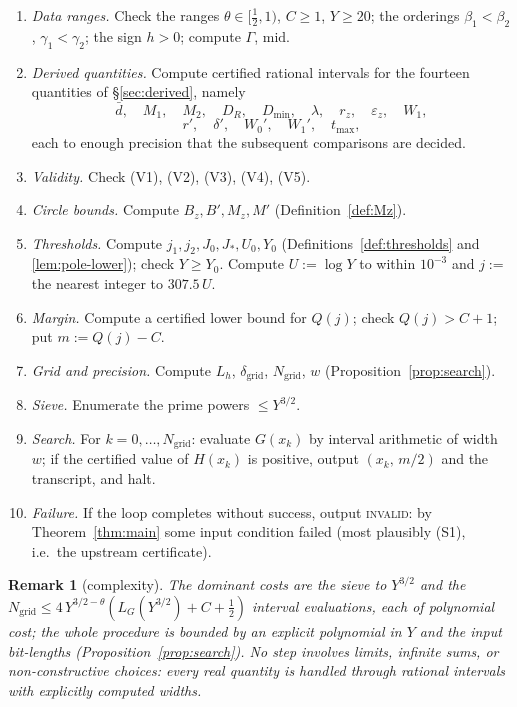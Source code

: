 \documentclass[11pt]{amsart}
\newtheorem{remark}[theorem]{Remark}
\numberwithin{equation}{section}
\newcommand{\dbar}{\bar{d}}
\begin{document}
\begin{enumerate}
\item \emph{Data ranges.} Check the ranges $\theta \in [\tfrac12, 1)$,
$C \ge 1$, $Y \ge 20$; the orderings $\beta_1 < \beta_2$,
$\gamma_1 < \gamma_2$; the sign $h > 0$; compute $\Gamma$,
$\mathrm{mid}$.
\item \emph{Derived quantities.} Compute certified rational intervals
for the fourteen quantities of \S\ref{sec:derived}, namely
\[
\dbar,\quad M_1,\quad M_2,\quad D_R,\quad D_{\min},\quad \lambda,\quad
r_z,\quad \varepsilon_z,\quad W_1,
\]
\[
r',\quad \delta',\quad W_0',\quad W_1',\quad t_{\max},
\]
each to enough precision that the subsequent comparisons are decided.
\item \emph{Validity.} Check (V1), (V2), (V3), (V4), (V5).
\item \emph{Circle bounds.} Compute $B_z, B', M_z, M'$
(Definition~\ref{def:Mz}).
\item \emph{Thresholds.} Compute $j_1, j_2, J_0, J_*, U_0, Y_0$
(Definitions~\ref{def:thresholds} and \ref{lem:pole-lower});
check $Y \ge Y_0$. Compute $U := \log Y$ to within $10^{-3}$ and
$j :=$ the nearest integer to $307.5\,U$.
\item \emph{Margin.} Compute a certified lower bound for
$Q(j)$; check $Q(j) > C + 1$; put $m := Q(j) - C$.
\item \emph{Grid and precision.} Compute $L_h$,
$\delta_{\mathrm{grid}}$, $N_{\mathrm{grid}}$, $w$
(Proposition~\ref{prop:search}).
\item \emph{Sieve.} Enumerate the prime powers $\le Y^{3/2}$.
\item \emph{Search.} For $k = 0, \ldots, N_{\mathrm{grid}}$:
evaluate $G(x_k)$ by interval arithmetic of width $w$; if the
certified value of $H(x_k)$ is positive, output
$(x_k,\, m/2)$ and the transcript, and halt.
\item \emph{Failure.} If the loop completes without success, output
\textsc{invalid}: by Theorem~\ref{thm:main} some input condition
failed (most plausibly (S1), i.e.\ the upstream certificate).
\end{enumerate}

\begin{remark}[complexity]
The dominant costs are the sieve to $Y^{3/2}$ and the
$N_{\mathrm{grid}} \le 4\,Y^{3/2-\theta}(L_G(Y^{3/2}) + C +
\tfrac12)$ interval evaluations, each of polynomial cost; the whole
procedure is bounded by an explicit polynomial in $Y$ and the input
bit-lengths (Proposition~\ref{prop:search}). No step involves limits,
infinite sums, or non-constructive choices: every real quantity is
handled through rational intervals with explicitly computed widths.
\end{remark}
\end{document}
